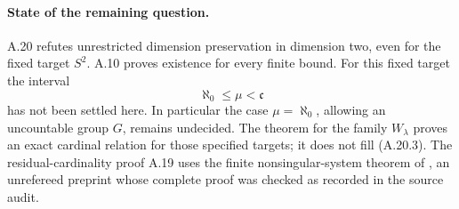 \paragraph{State of the remaining question.}
A.20 refutes unrestricted dimension preservation in dimension
two, even for the fixed target $S^2$. A.10 proves existence for
every finite bound. For this fixed target the interval
\[
 \aleph_0\leq\mu<\mathfrak c
 \tag{A.20.3}
\]
has not been settled here. In particular the case
$\mu=\aleph_0$, allowing an uncountable group $G$, remains
undecided. The theorem for the family $W_\lambda$ proves an
exact cardinal relation for those specified targets; it does
not fill (A.20.3). The residual-cardinality proof A.19 uses the
finite nonsingular-system theorem of
\citet{D_OpenAI2026Nonsingular}, an unrefereed preprint whose
complete proof was checked as recorded in the source audit.
